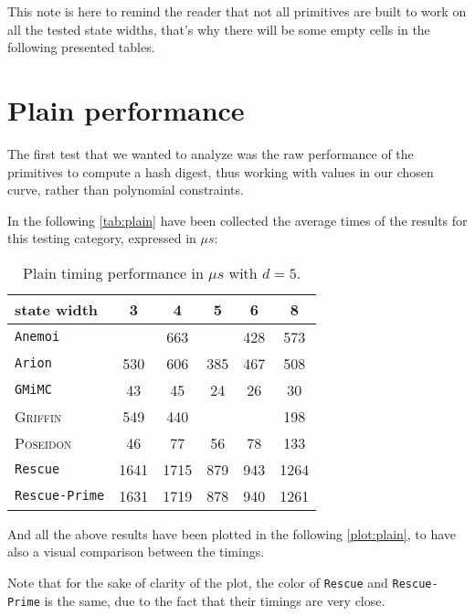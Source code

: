 \documentclass[12pt, a4paper]{report}
\begin{document}
\begin{note}
  This note is here to remind the reader that not all primitives are built to work on all the tested state widths, that's why there will be some empty cells in the following presented tables.
\end{note}

\section{Plain performance}\label{sec:plain}

The first test that we wanted to analyze was the raw performance of the primitives to compute a hash digest, thus working with values in our chosen curve, rather than polynomial constraints.

In the following \autoref{tab:plain} have been collected the average times of the results for this testing category, expressed in $\mu s$:

\begin{table}[H]
  \caption{Plain timing performance in $\mu s$ with $d = 5$.}\label{tab:plain}
  \begin{center}
    \begin{tabular}{|l|c|c|c|c|c|}
      \hline
        state width & 3 & 4 & 5 & 6 & 8 \\
      \hline
        \texttt{Anemoi} & & 663 &  & 428 & 573 \\
        \texttt{Arion} & 530 & 606 & 385 & 467 & 508 \\
        \texttt{GMiMC} & 43 & 45 & \cellcolor{green!35} 24 & 26 & 30 \\
        \textsc{Griffin} & 549 & 440 & & & 198 \\
        \textsc{Poseidon} & 46 & 77 & 56 & 78 & 133 \\
        \texttt{Rescue} & \cellcolor{orange!35} 1641 & \cellcolor{orange!35} 1715 & 879 & 943 & \cellcolor{orange!35} 1264 \\
        \texttt{Rescue-Prime} & \cellcolor{orange!35} 1631 & \cellcolor{red!35} 1719 & 878 & 940 &  \cellcolor{orange!35} 1261 \\
      \hline
    \end{tabular}
  \end{center}
\end{table}

And all the above results have been plotted in the following \autoref{plot:plain}, to have also a visual comparison between the timings.

Note that for the sake of clarity of the plot, the color of \texttt{Rescue} and \texttt{Rescue-Prime} is the same, due to the fact that their timings are very close.
\end{document}
